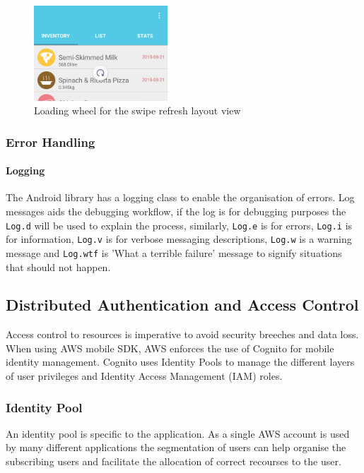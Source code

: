 \documentclass[a4paper, 11pt]{article}
\begin{document}
\begin{figure}[!htbp]
\centering
\includegraphics[width=5cm]{swiperefreshlayout}
\caption{Loading wheel for the swipe refresh layout view} \label{fig:swiperefreshlayout}
\end{figure}


\subsubsection{Error Handling}
\paragraph{Logging} The Android library has a logging class to enable the organisation of errors. Log messages aids the debugging workflow, if the log is for debugging purposes the \texttt{Log.d} will be used to explain the process, similarly, \texttt{Log.e} is for errors, \texttt{Log.i} is for information, \texttt{Log.v} is for verbose messaging descriptions, \texttt{Log.w} is a warning message and \texttt{Log.wtf} is 'What a terrible failure' message to signify situations that should not happen. \cite{android}

\subsection{Distributed Authentication and Access Control}
Access control to resources is imperative to avoid security breeches and data loss. When using AWS mobile SDK, AWS enforces the use of Cognito for mobile identity management. Cognito uses Identity Pools to manage the different layers of user privileges and Identity Access Management (IAM) roles.

\subsubsection{Identity Pool}
An identity pool is specific to the application. As a single AWS account is used by many different applications the segmentation of users can help organise the subscribing users and facilitate the allocation of correct recourses to the user. 
\end{document}
